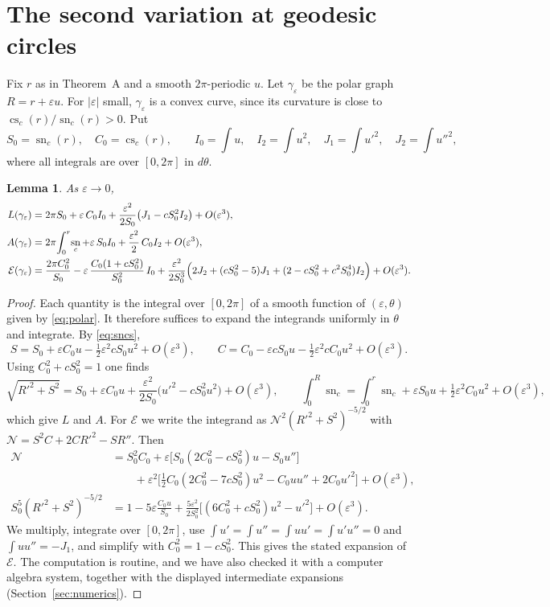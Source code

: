\documentclass[11pt]{amsart}
\newtheorem{lemma}[theorem]{Lemma}
\theoremstyle{definition}
\theoremstyle{remark}
\numberwithin{equation}{section}
\DeclareMathOperator{\sn}{sn}
\DeclareMathOperator{\cs}{cs}
\newcommand{\eps}{\varepsilon}
\newcommand{\E}{\mathcal{E}}
\begin{document}
\section{The second variation at geodesic circles}\label{sec:second}

Fix $r$ as in Theorem~A and a smooth $2\pi$-periodic $u$. Let $\gamma_\eps$ be the polar graph $R=r+\eps u$. For $|\eps|$ small, $\gamma_\eps$ is a convex curve, since its curvature is close to $\cs_c(r)/\sn_c(r)>0$. Put
\[
S_0=\sn_c(r),\quad C_0=\cs_c(r),\qquad I_0=\int u,\quad I_2=\int u^2,\quad J_1=\int u'^2,\quad J_2=\int u''^2,
\]
where all integrals are over $[0,2\pi]$ in $d\theta$.

\begin{lemma}\label{lem:expansions}
As $\eps\to0$,
\begin{align*}
L(\gamma_\eps)&=2\pi S_0+\eps\,C_0I_0+\frac{\eps^2}{2S_0}\bigl(J_1-cS_0^2I_2\bigr)+O(\eps^3),\\
A(\gamma_\eps)&=2\pi\!\int_0^r\!\sn_c+\eps\,S_0I_0+\frac{\eps^2}{2}\,C_0I_2+O(\eps^3),\\
\E(\gamma_\eps)&=\frac{2\pi C_0^2}{S_0}-\eps\,\frac{C_0(1+cS_0^2)}{S_0^2}\,I_0+\frac{\eps^2}{2S_0^3}\Bigl(2J_2+(cS_0^2-5)J_1+(2-cS_0^2+c^2S_0^4)I_2\Bigr)+O(\eps^3).
\end{align*}
\end{lemma}

\begin{proof}
Each quantity is the integral over $[0,2\pi]$ of a smooth function of $(\eps,\theta)$ given by \eqref{eq:polar}. It therefore suffices to expand the integrands uniformly in $\theta$ and integrate. By \eqref{eq:sncs},
\[
S=S_0+\eps C_0u-\tfrac12\eps^2cS_0u^2+O(\eps^3),\qquad C=C_0-\eps cS_0u-\tfrac12\eps^2cC_0u^2+O(\eps^3).
\]
Using $C_0^2+cS_0^2=1$ one finds
\[
\sqrt{R'^2+S^2}=S_0+\eps C_0u+\frac{\eps^2}{2S_0}\bigl(u'^2-cS_0^2u^2\bigr)+O(\eps^3),\qquad
\int_0^{R}\sn_c=\int_0^r\sn_c+\eps S_0u+\tfrac12\eps^2C_0u^2+O(\eps^3),
\]
which give $L$ and $A$. For $\E$ we write the integrand as $\mathcal N^2(R'^2+S^2)^{-5/2}$ with $\mathcal N=S^2C+2CR'^2-SR''$. Then
\begin{align*}
\mathcal N&=S_0^2C_0+\eps\bigl[S_0(2C_0^2-cS_0^2)u-S_0u''\bigr]\\
&\qquad+\eps^2\bigl[\tfrac12C_0(2C_0^2-7cS_0^2)u^2-C_0uu''+2C_0u'^2\bigr]+O(\eps^3),\\
S_0^5(R'^2+S^2)^{-5/2}&=1-5\eps\frac{C_0u}{S_0}+\frac{5\eps^2}{2S_0^2}\bigl[(6C_0^2+cS_0^2)u^2-u'^2\bigr]+O(\eps^3).
\end{align*}
We multiply, integrate over $[0,2\pi]$, use $\int u'=\int u''=\int uu'=\int u'u''=0$ and $\int uu''=-J_1$, and simplify with $C_0^2=1-cS_0^2$. This gives the stated expansion of $\E$. The computation is routine, and we have also checked it with a computer algebra system, together with the displayed intermediate expansions (Section~\ref{sec:numerics}).
\end{proof}
\end{document}
